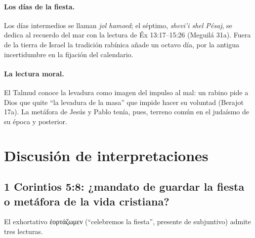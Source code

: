 \documentclass[11pt,letterpaper]{article}
\newcommand{\grc}[1]{\foreignlanguage{ancientgreek}{#1}}
\begin{document}
\paragraph{Los días de la fiesta.} Los días intermedios se llaman \emph{jol hamoed}; el séptimo, \emph{shevi'i shel Pésaj}, se dedica al recuerdo del mar con la lectura de Éx 13:17--15:26 (Meguilá 31a). Fuera de la tierra de Israel la tradición rabínica añade un octavo día, por la antigua incertidumbre en la fijación del calendario.

\paragraph{La lectura moral.} El Talmud conoce la levadura como imagen del impulso al mal: un rabino pide a Dios que quite ``la levadura de la masa'' que impide hacer su voluntad (Berajot 17a). La metáfora de Jesús y Pablo tenía, pues, terreno común en el judaísmo de su época y posterior.

\section{Discusión de interpretaciones}\label{sec:discusion}

\subsection{1 Corintios 5:8: ¿mandato de guardar la fiesta o metáfora de la vida cristiana?}
El exhortativo \grc{ἑορτάζωμεν} (``celebremos la fiesta'', presente de subjuntivo) admite tres lecturas.
\end{document}
